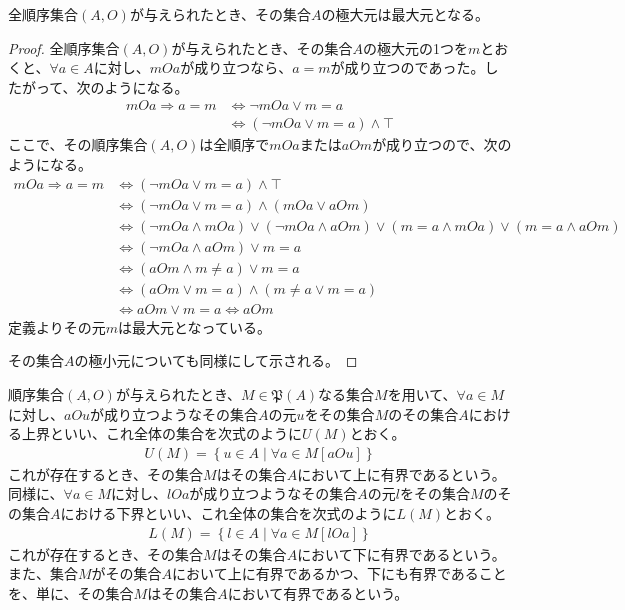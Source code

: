 \documentclass[dvipdfmx]{jsarticle}
\begin{document}
\begin{thm}\label{1.3.1.6}
全順序集合$(A,O)$が与えられたとき、その集合$A$の極大元は最大元となる。
\end{thm}
\begin{proof}
全順序集合$(A,O)$が与えられたとき、その集合$A$の極大元の1つを$m$とおくと、$\forall a \in A$に対し、$mOa$が成り立つなら、$a = m$が成り立つのであった。したがって、次のようになる。
\begin{align*}
mOa \Rightarrow a = m &\Leftrightarrow \neg mOa \vee m = a\\
&\Leftrightarrow (\neg mOa \vee m = a) \land \top
\end{align*}
ここで、その順序集合$(A,O)$は全順序で$mOa$または$aOm$が成り立つので、次のようになる。
\begin{align*}
mOa \Rightarrow a = m &\Leftrightarrow (\neg mOa \vee m = a) \land \top\\
&\Leftrightarrow (\neg mOa \vee m = a) \land (mOa \vee aOm)\\
&\Leftrightarrow (\neg mOa \land mOa) \vee (\neg mOa \land aOm) \vee (m = a \land mOa) \vee (m = a \land aOm)\\
&\Leftrightarrow (\neg mOa \land aOm) \vee m = a\\
&\Leftrightarrow (aOm \land m \neq a) \vee m = a\\
&\Leftrightarrow (aOm \vee m = a) \land (m \neq a \vee m = a)\\
&\Leftrightarrow aOm \vee m = a \Leftrightarrow aOm
\end{align*}
定義よりその元$m$は最大元となっている。\par
その集合$A$の極小元についても同様にして示される。
\end{proof}
\begin{dfn}
順序集合$(A,O)$が与えられたとき、$M \in \mathfrak{P}(A)$なる集合$M$を用いて、$\forall a \in M$に対し、$aOu$が成り立つようなその集合$A$の元$u$をその集合$M$のその集合$A$における上界といい、これ全体の集合を次式のように$U(M)$とおく。
\begin{align*}
U(M) = \left\{ u \in A \middle| \forall a \in M[ aOu] \right\}
\end{align*}
これが存在するとき、その集合$M$はその集合$A$において上に有界であるという。同様に、$\forall a \in M$に対し、$lOa$が成り立つようなその集合$A$の元$l$をその集合$M$のその集合$A$における下界といい、これ全体の集合を次式のように$L(M)$とおく。
\begin{align*}
L(M) = \left\{ l \in A \middle| \forall a \in M[ lOa] \right\}
\end{align*}
これが存在するとき、その集合$M$はその集合$A$において下に有界であるという。また、集合$M$がその集合$A$において上に有界であるかつ、下にも有界であることを、単に、その集合$M$はその集合$A$において有界であるという。
\end{dfn}
\end{document}
